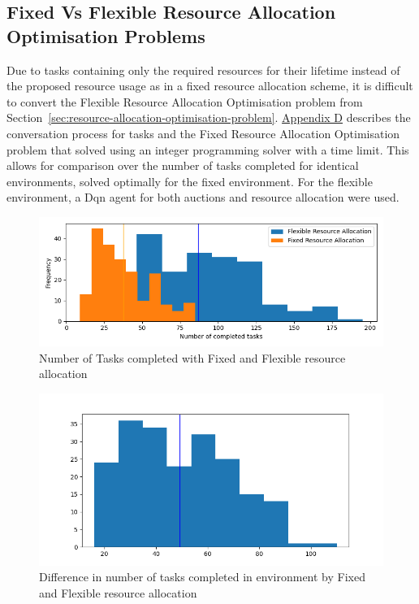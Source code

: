 \subsection{Fixed Vs Flexible Resource Allocation Optimisation Problems}
\label{subsec:fixed-vs-flexible-resource-allocation-optimisation-problems}
Due to tasks containing only the required resources for their lifetime instead of the proposed resource usage as in a
fixed resource allocation scheme, it is difficult to convert the Flexible Resource Allocation Optimisation problem from
Section~\ref{sec:resource-allocation-optimisation-problem}.
\hyperref[app:fixed-resource-allocation-optimisation-problem]{Appendix D} describes the conversation process for tasks
and the Fixed Resource Allocation Optimisation problem that solved using an integer programming solver with a time
limit. This allows for comparison over the number of tasks completed for identical environments, solved optimally for
the fixed environment. For the flexible environment, a Dqn agent for both auctions and resource allocation were used.

\begin{figure}[H]
    \centering
    \includegraphics[width=\textwidth]{figures/5_evaluation_figs/fixed_flexible_completed_tasks.png}
    \caption{Number of Tasks completed with Fixed and Flexible resource allocation}
    \label{fig:number-task-completed-fixed-flexible}
\end{figure}

\begin{figure}[H]
    \centering
    \includegraphics[width=\textwidth]{figures/5_evaluation_figs/fixed_flexible_tasks_difference.png}
    \caption{Difference in number of tasks completed in environment by Fixed and Flexible resource allocation}
    \label{fig:difference-number-task-completed-fixed-flexible}
\end{figure}

